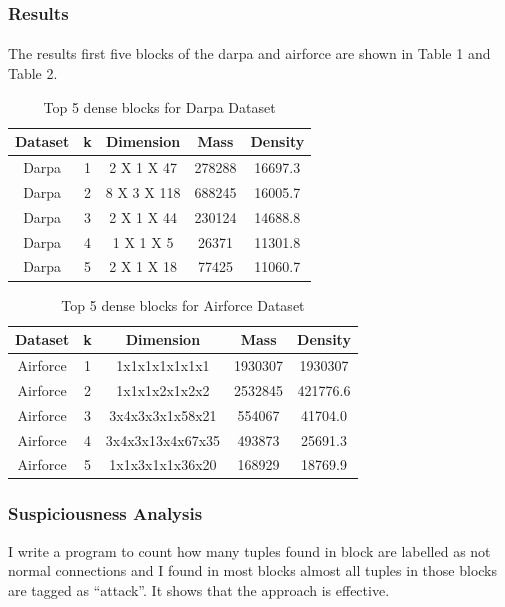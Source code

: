 \subsubsection{Results}
\paragraph{} The results first five blocks of the darpa and airforce are shown in Table 1 and Table 2.
\begin{table}
\centering
\begin{tabular}{|c|c|c|c|c|}
    \hline
        Dataset & k & Dimension & Mass & Density \\
    \hline
        Darpa & 1 & 2 X 1 X 47 & 278288 & 16697.3 \\
    \hline
        Darpa & 2 & 8 X 3 X 118 & 688245 & 16005.7 \\
    \hline
        Darpa & 3 & 2 X 1 X 44 & 230124 & 14688.8 \\
    \hline
        Darpa & 4 & 1 X 1 X 5 & 26371 & 11301.8 \\
    \hline
        Darpa & 5 & 2 X 1 X 18 & 77425 & 11060.7 \\
    \hline
\end{tabular}
\caption {Top 5 dense blocks for Darpa Dataset}
\end{table}

\begin{table}
\centering
\begin{tabular}{|c|c|c|c|c|}
    \hline
        Dataset & k & Dimension & Mass & Density \\
    \hline
        Airforce & 1 & 1x1x1x1x1x1x1 & 1930307 & 1930307 \\
    \hline
        Airforce & 2 & 1x1x1x2x1x2x2 & 2532845 & 421776.6 \\
    \hline
        Airforce & 3 & 3x4x3x3x1x58x21 & 554067 & 41704.0\\
    \hline
        Airforce & 4 & 3x4x3x13x4x67x35 & 493873 & 25691.3 \\
    \hline
        Airforce & 5 & 1x1x3x1x1x36x20 & 168929 & 18769.9 \\
    \hline
\end{tabular}
\caption {Top 5 dense blocks for Airforce Dataset}
\end{table}

\subsubsection{Suspiciousness Analysis}
I write a program to count how many tuples found in block are labelled as not normal connections and I found in most blocks almost all tuples in those blocks are tagged as ``attack''. It shows that the approach is effective. 

